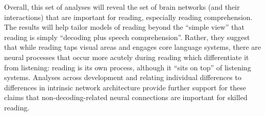 Overall, this set of analyses will reveal the set of brain networks (and their interactions) that are important for reading, especially reading comprehension. The results will help tailor models of reading beyond the ``simple view'' that reading is simply ``decoding plus speech comprehension''. Rather, they suggest that while reading taps visual areas and engages core language systems, there are neural processes that occur more acutely during reading which differentiate it from listening: reading is its own process, although it ``sits on top'' of listening systems. Analyses across development and relating individual differences to differences in intrinsic network architecture provide further support for these claims that non-decoding-related neural connections are important for skilled reading. 
